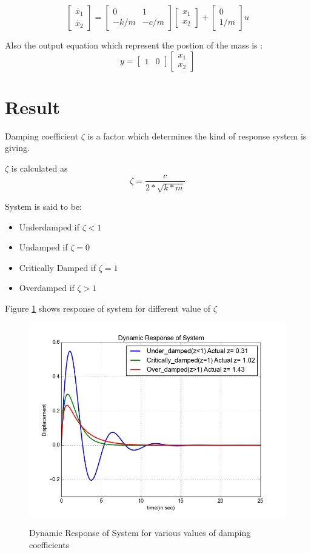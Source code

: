 \documentclass[a4paper,12pt,twocolumn]{article}
\begin{document}
\[
\begin{bmatrix} 
	\dot{x_1}\\ \dot{x_2} 
\end{bmatrix} = 
\begin{bmatrix} 
	0 & 1 \\ 
	- k/m &-c/m 
\end{bmatrix} 
\begin{bmatrix} 
	x_1\\x_2 
\end{bmatrix} + 
\begin{bmatrix} 
	0\\
	1/m 
\end{bmatrix} u  
\]
  
Also the output equation which represent the postion of the mass is :
\[
	y = 
	\begin{bmatrix} 
		{1}&{0} 
	\end{bmatrix} 
	\begin{bmatrix} 
		{x_1}\\ {x_2} 
	\end{bmatrix}   
\]

 
\section{Result}  
	Damping coefficient $\zeta$ is a factor which determines the kind of response system is giving.
	
	$\zeta$ is calculated as 
	\[ \zeta = \frac{c}{2*\sqrt{k*m}} \]
	
	System is said to be:
	 \begin{itemize}
		\item Underdamped if $\zeta < 1$
		\item Undamped if $\zeta = 0 $
		\item Critically Damped if $\zeta = 1$
		\item Overdamped if $\zeta > 1$
	 \end{itemize}
Figure \ref{fig:Response} shows response of system for different value of $\zeta$

\begin{figure}
\centering
\includegraphics[scale = 0.5]{Response}
\label{fig:Response}
\caption{Dynamic Response of System for various values of damping coefficients}
\end{figure}
\end{document}
